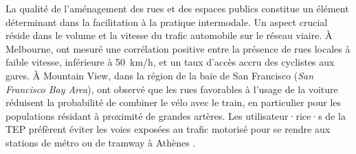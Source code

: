 \begin{refsegment}
La qualité de l'aménagement des rues et des espaces publics constitue un élément déterminant dans la facilitation à la pratique intermodale. Un aspect crucial réside dans le volume et la vitesse du trafic automobile sur le réseau viaire. À Melbourne, \textcolor{blue}{\textcite[403]{weliwitiya_bicycle_2019}} ont mesuré une corrélation positive entre la présence de rues locales à faible vitesse, inférieure à 50~km/h, et un taux d'accès accru des cyclistes aux gares. À Mountain View, dans la région de la baie de San Francisco (\textsl{San Francisco Bay Area}), \textcolor{blue}{\textcite[656]{park_finding_2014}} ont observé que les rues favorables à l'usage de la voiture réduisent la probabilité de combiner le vélo avec le train, en particulier pour les populations résidant à proximité de grandes artères. Les utilisateur·rice·s de la \acrshort{TEP} préfèrent éviter les voies exposées au trafic motorisé pour se rendre aux stations de métro ou de tramway à Athènes \textcolor{blue}{\autocite[10]{tzouras_describing_2023}}.%


\end{refsegment}
